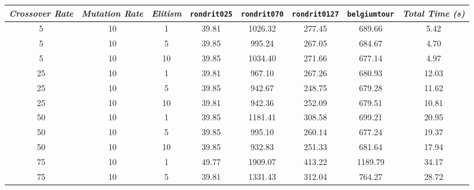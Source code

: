 
\begin{table}[H]
\centering

\footnotesize
{\renewcommand{\arraystretch}{1}}
\begin{tabular}{ccc|c|c|c|c|c}
\textit{Crossover Rate} & \textit{Mutation Rate} & \textit{Elitism} & \texttt{rondrit025} & \texttt{rondrit070} & \texttt{rondrit0127} & \texttt{belgiumtour} & \textit{Total Time (s)} \\\hline
5 & 10 & 1 & \cellcolor{gray!50}39.81 & \cellcolor{gray!1}1026.32 & \cellcolor{gray!1}277.45 & \cellcolor{gray!41}689.66 & 5.42\\
5 & 10 & 5 & \cellcolor{gray!50}39.85 & \cellcolor{gray!6}995.24 & \cellcolor{gray!1}267.05 & \cellcolor{gray!43}684.67 & 4.70\\
5 & 10 & 10 & \cellcolor{gray!50}39.85 & \cellcolor{gray!1}1034.40 & \cellcolor{gray!1}271.66 & \cellcolor{gray!45}677.14 & 4.97\\
25 & 10 & 1 & \cellcolor{gray!50}39.81 & \cellcolor{gray!10}967.10 & \cellcolor{gray!1}267.26 & \cellcolor{gray!44}680.93 & 12.03\\
25 & 10 & 5 & \cellcolor{gray!50}39.85 & \cellcolor{gray!14}942.67 & \cellcolor{gray!1}248.75 & \cellcolor{gray!45}679.28 & 11.62\\
25 & 10 & 10 & \cellcolor{gray!50}39.81 & \cellcolor{gray!14}942.36 & \cellcolor{gray!1}252.09 & \cellcolor{gray!44}679.51 & 10.81\\
50 & 10 & 1 & \cellcolor{gray!50}39.85 & \cellcolor{gray!1}1181.41 & \cellcolor{gray!1}308.58 & \cellcolor{gray!38}699.21 & 20.95\\
50 & 10 & 5 & \cellcolor{gray!50}39.85 & \cellcolor{gray!6}995.10 & \cellcolor{gray!1}260.14 & \cellcolor{gray!45}677.24 & 19.37\\
50 & 10 & 10 & \cellcolor{gray!50}39.85 & \cellcolor{gray!16}932.83 & \cellcolor{gray!1}251.33 & \cellcolor{gray!44}681.64 & 17.94\\
75 & 10 & 1 & \cellcolor{gray!1}49.77 & \cellcolor{gray!1}1909.07 & \cellcolor{gray!1}413.22 & \cellcolor{gray!1}1189.79 & 34.17\\
75 & 10 & 5 & \cellcolor{gray!50}39.81 & \cellcolor{gray!1}1331.43 & \cellcolor{gray!1}312.04 & \cellcolor{gray!18}764.27 & 28.72\\

\end{tabular}
\end{table}
